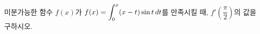 \hspace*{2mm}\begin{minipage}[t]{\dimexpr\linewidth-2mm\relax}\vspace{0pt}
미분가능한 함수 $f(x)$가 $f(x)=\displaystyle\int_{0}^{x}(x-t)\sin t\mkern3mu dt$를 만족시킬 때, $f'\!\left(\dfrac{\pi}{2}\right)$의 값을 구하시오.\end{minipage}
